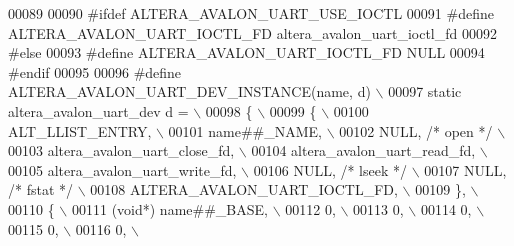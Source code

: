 \begin{DoxyCode}
00089 
00090 \textcolor{preprocessor}{#ifdef ALTERA\_AVALON\_UART\_USE\_IOCTL}
00091 \textcolor{preprocessor}{#define ALTERA\_AVALON\_UART\_IOCTL\_FD altera\_avalon\_uart\_ioctl\_fd}
00092 \textcolor{preprocessor}{#else}
00093 \textcolor{preprocessor}{#define ALTERA\_AVALON\_UART\_IOCTL\_FD NULL}
00094 \textcolor{preprocessor}{#endif}
00095 
00096 \textcolor{preprocessor}{#define ALTERA\_AVALON\_UART\_DEV\_INSTANCE(name, d)       \(\backslash\)}
00097 \textcolor{preprocessor}{  static altera\_avalon\_uart\_dev d =                    \(\backslash\)}
00098 \textcolor{preprocessor}{   \{                                                   \(\backslash\)}
00099 \textcolor{preprocessor}{     \{                                                 \(\backslash\)}
00100 \textcolor{preprocessor}{       ALT\_LLIST\_ENTRY,                                \(\backslash\)}
00101 \textcolor{preprocessor}{       name##\_NAME,                                    \(\backslash\)}
00102 \textcolor{preprocessor}{       NULL, }\textcolor{comment}{/* open */}\textcolor{preprocessor}{                                \(\backslash\)}
00103 \textcolor{preprocessor}{       altera\_avalon\_uart\_close\_fd,                    \(\backslash\)}
00104 \textcolor{preprocessor}{       altera\_avalon\_uart\_read\_fd,                     \(\backslash\)}
00105 \textcolor{preprocessor}{       altera\_avalon\_uart\_write\_fd,                    \(\backslash\)}
00106 \textcolor{preprocessor}{       NULL, }\textcolor{comment}{/* lseek */}\textcolor{preprocessor}{                               \(\backslash\)}
00107 \textcolor{preprocessor}{       NULL, }\textcolor{comment}{/* fstat */}\textcolor{preprocessor}{                               \(\backslash\)}
00108 \textcolor{preprocessor}{       ALTERA\_AVALON\_UART\_IOCTL\_FD,                    \(\backslash\)}
00109 \textcolor{preprocessor}{     \},                                                \(\backslash\)}
00110 \textcolor{preprocessor}{     \{                                                 \(\backslash\)}
00111 \textcolor{preprocessor}{       (void*) name##\_BASE,                            \(\backslash\)}
00112 \textcolor{preprocessor}{       0,                                              \(\backslash\)}
00113 \textcolor{preprocessor}{       0,                                              \(\backslash\)}
00114 \textcolor{preprocessor}{       0,                                              \(\backslash\)}
00115 \textcolor{preprocessor}{       0,                                              \(\backslash\)}
00116 \textcolor{preprocessor}{       0,                                              \(\backslash\)}

\end{DoxyCode}
